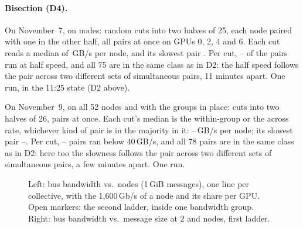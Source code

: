 \paragraph{Bisection (D4).} On November~7, on \TriFullNodes{} nodes: \TriBisectionCuts{} random cuts into two halves of 25, each node paired with one in the other half, all \TriBisectionPairs{} pairs at once on GPUs 0, 2, 4 and 6. Each cut reads a median of \TriBisection\,GB/s per node, and its slowest pair \TriBisectionMin. Per cut, \TriBisectionSlowLo--\TriBisectionSlowHi{} of the \TriBisectionPairs{} pairs run at half speed, and all 75 are in the same class as in D2: the half speed follows the pair across two different sets of simultaneous pairs, 11 minutes apart. One run, in the 11:25 state (D2 above).

On November~9, on all 52 nodes and with the groups in place: \TriNineCuts{} cuts into two halves of 26, \TriNineCutPairs{} pairs at once. Each cut's median is the within-group or the across rate, whichever kind of pair is in the majority in it: \TriNineBisectLo--\TriNineBisectHi\,GB/s per node; its slowest pair \TriNineBisectMinLo--\TriNineBisectMinHi. Per cut, \TriNineBisectSlowLo--\TriNineBisectSlowHi{} pairs ran below 40\,GB/s, and all 78 pairs are in the same class as in D2: here too the slowness follows the pair across two different sets of simultaneous pairs, a few minutes apart. One run.

\begin{figure}[h]
  \centering{}
  \caption{Left: bus bandwidth vs.\ nodes (1\,GiB messages), one line per collective, with the 1,600\,Gb/s of a node and its share per GPU. Open markers: the second ladder, inside one bandwidth group. Right: bus bandwidth vs.\ message size at 2 and \TriNetTop{} nodes, first ladder. }
  \label{fig:collectives_scale}
\end{figure}
